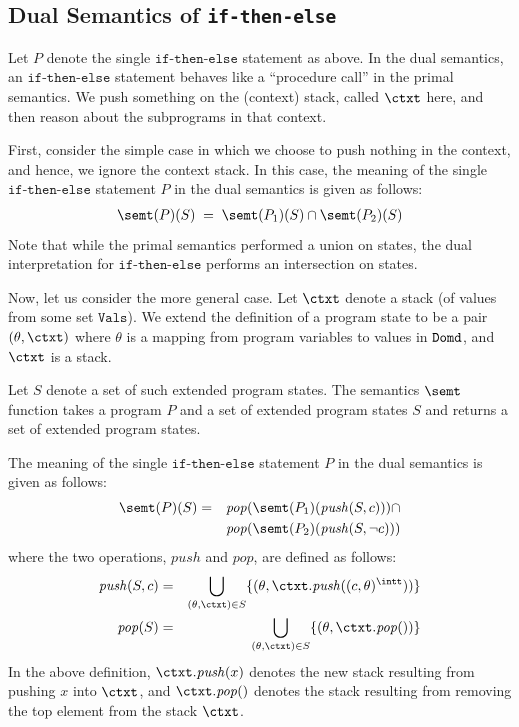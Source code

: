 \documentclass[preprint]{sig-alternate-05-2015}
\def\domd{{\tt{Domd}}}
\def\vals{{\mathtt{Vals}}}
\def\ite{{\texttt{if-then-else}}}
\def\push{{\mathit{push}}}
\def\pop{{\mathit{pop}}}
\begin{document}
{\subsection{Dual Semantics of \ite}

Let $P$ denote the single $\ite$ statement as above.
In the dual semantics, an $\ite$ statement behaves like a
``procedure call'' in the primal semantics. We push something
on the (context) stack, called $\ctxt$ here, and then reason about
the subprograms in that context.

First, consider the simple case in which we choose to push
nothing in the context, and hence, we ignore the context stack.
In this case,
the meaning of the single $\ite$ statement
$P$ in the dual semantics is given as follows:
\[
  \begin{array}{l}
    \semt(P)(S) \; = \;
     \semt(P_1)(S) \cap \semt(P_2)(S)
\end{array}
\]
Note that while the primal semantics performed a union
on states, the dual interpretation for $\ite$ performs
an intersection on states.

Now, let us consider the more general case.
Let $\ctxt$ denote a
stack (of values from some set $\vals$).
We extend the definition of a program state to
be a pair $(\theta,\ctxt)$ where
$\theta$ is a mapping from program variables to values in
$\domd$, and $\ctxt$ is a stack.


Let $S$ denote a set of such extended program states.
The semantics $\semt$ function takes a program $P$ and
a set of extended program states $S$ and returns
a set of extended program states.

The meaning of the single $\ite$ statement
$P$ in the dual semantics is given as follows:
\begin{eqnarray}
    \semt(P)(S) & = &
     \pop(\semt(P_1)(\push(S,c))) \cap
     \nonumber
     \\ & &
     \pop(\semt(P_2)(\push(S,\neg c)) )
     \label{eqn:iteSem}
\end{eqnarray}
where the two operations, $\push$ and $\pop$, are defined as follows:
\begin{eqnarray}
  \push(S,c) & = & \bigcup_{(\theta,\ctxt)\in S}\{ (\theta,\ctxt.\push((c,\theta)^\intt))\}
     \nonumber
     \\
     \pop(S) & = & \bigcup_{(\theta,\ctxt)\in S}\{ (\theta,\ctxt.\pop()) \}
     \label{eqn:pushpop}
\end{eqnarray}
In the above definition,
$\ctxt.\push(x)$ denotes the new stack resulting from pushing
$x$ into $\ctxt$, and $\ctxt.\pop()$ denotes the stack resulting
from removing the top element from the stack $\ctxt$.

}
\end{document}
